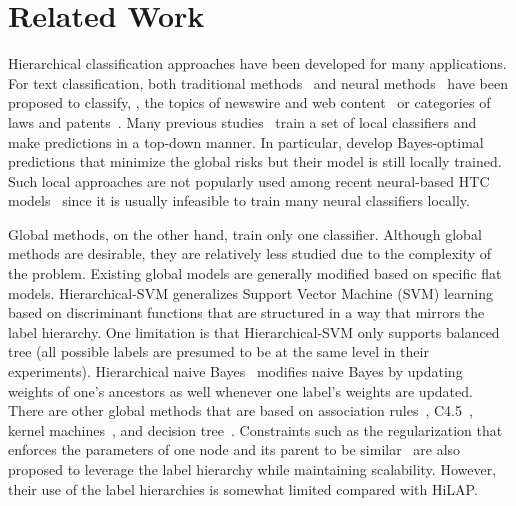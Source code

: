 \documentclass[11pt,a4paper]{article}
\begin{document}
 
\section{Related Work}
Hierarchical classification approaches have been developed for many applications.
For text classification, both traditional methods~\citep{lewis2004rcv1,gopal2013recursive} and neural methods~\citep{johnson2014effective,peng2018large} have been proposed to classify, \eg, the topics of newswire and web content~\citep{Sun2001HierarchicalTC} or categories of laws and patents~\citep{bi2015bayes,cai2004hierarchical,rousu2005learning}.
Many previous studies~\citep{liu2005support,Sun2001HierarchicalTC} train a set of local classifiers and make predictions in a top-down manner. In particular, \citet{bi2015bayes} develop Bayes-optimal predictions that minimize the global risks but their model is still locally trained.
Such local approaches are not popularly used among recent neural-based HTC models~\citep{johnson2014effective,peng2018large} since it is usually infeasible to train many neural classifiers locally.

Global methods, on the other hand, train only one classifier.
Although global methods are desirable, they are relatively less studied due to the complexity of the problem.
Existing global models are generally modified based on specific flat models.
Hierarchical-SVM \citep{cai2004hierarchical,qiu2009hierarchical} generalizes Support Vector Machine (SVM) learning based on discriminant functions that are structured in a way that mirrors the label hierarchy. One limitation is that Hierarchical-SVM only supports balanced tree (all possible labels are presumed to be at the same level in their experiments).
Hierarchical naive Bayes~\citep{silla2009global} modifies naive Bayes by updating weights of one's ancestors as well whenever one label's weights are updated.
There are other global methods that are based on association rules~\citep{wang2001hierarchical}, C4.5~\citep{clare2003predicting}, kernel machines~\citep{rousu2005learning}, and decision tree~\citep{vens2008decision}.
Constraints such as the regularization that enforces the parameters of one node and its parent to be similar~\citep{gopal2013recursive} are also proposed to leverage the label hierarchy while maintaining scalability. However, their use of the label hierarchies is somewhat limited compared with HiLAP.

 
\end{document}
